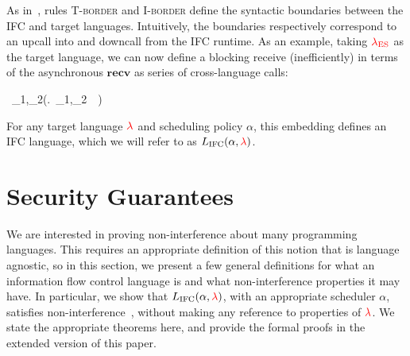 \documentclass{llncs}
\newcommand{\Varid}[1]{\mathit{#1}}
\def\resethooks{\global\let\SaveRestoreHook\empty
  \global\let\ColumnHook\empty}
\let\hspost\empty
\newif\ifextended
\newcommand{\Red}[1]{{\color{red} #1}}
\newcommand{\appref}[1]{\ifextended Appendix~\ref{#1}\else the extended version of this paper\fi }
\begin{document}
As in~\cite{Matthews:2007:OSM:1190216.1190220}, rules \textsc{T-border} and
\textsc{I-border} define the syntactic boundaries between the IFC and target
languages.
Intuitively, the boundaries respectively correspond to an upcall into and
downcall from the IFC runtime.
As an example, taking \ensuremath{\Red{\lambda_{\text{ES}}}} as the target language, we can now define a
blocking receive (inefficiently) in terms of the asynchronous \ensuremath{\mathbf{recv}} as series
of cross-language calls:
\begin{hscode}\SaveRestoreHook
\column{B}{@{}>{\hspre}l<{\hspost}@{}}\column{E}{@{}>{\hspre}l<{\hspost}@{}}\>[B]{}\ \ifc{\Varid{x}}_{1},\ifc{\Varid{x}}_{2}\;\;\ifc{\Varid{e}}\triangleq{}\;(\lambda \Varid{k}.\ \ifc{\Varid{x}}_{1},\ifc{\Varid{x}}_{2}\;\;\ifc{\Varid{e}}\ \ \Varid{k}\ifc{\rceil}\tar{\rfloor})\ifc{\rceil}{}\<[E]\ColumnHook
\end{hscode}\resethooks




For any target language \ensuremath{\Red{\lambda}} and scheduling policy \ensuremath{\alpha}, this
embedding defines an IFC language, which we will
refer to as \ensuremath{L_\text{IFC}(\alpha,\Red{\lambda})}.
\section{Security Guarantees}
\label{sec:formal}

We are interested in proving non-interference about many programming
languages.  This requires an appropriate definition of this notion
that is language agnostic, so in this section, we present a few
general definitions for what an information flow control language is
and what non-interference properties it may have.
In particular, we show that \ensuremath{L_\text{IFC}(\alpha,\Red{\lambda})}, with an appropriate
scheduler \ensuremath{\alpha}, satisfies non-interference~\cite{Goguen82},
without making any reference to properties of \ensuremath{\Red{\lambda}}.
We state the appropriate theorems here, and provide the formal
proofs in
\appref{sec:app:proof}.

\end{document}
